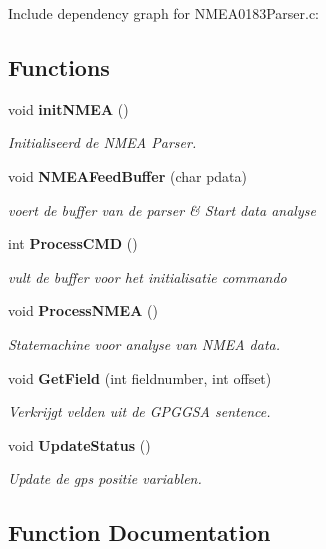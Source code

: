 Include dependency graph for NMEA0183Parser.c:\subsection*{Functions}
\begin{CompactItemize}
\item 
void {\bf initNMEA} ()
\begin{CompactList}\small\item\em Initialiseerd de NMEA Parser. \item\end{CompactList}\item 
void {\bf NMEAFeedBuffer} (char pdata)
\begin{CompactList}\small\item\em voert de buffer van de parser \& Start data analyse \item\end{CompactList}\item 
int {\bf ProcessCMD} ()
\begin{CompactList}\small\item\em vult de buffer voor het initialisatie commando \item\end{CompactList}\item 
void {\bf ProcessNMEA} ()
\begin{CompactList}\small\item\em Statemachine voor analyse van NMEA data. \item\end{CompactList}\item 
void {\bf GetField} (int fieldnumber, int offset)
\begin{CompactList}\small\item\em Verkrijgt velden uit de GPGGSA sentence. \item\end{CompactList}\item 
void {\bf UpdateStatus} ()
\begin{CompactList}\small\item\em Update de gps positie variablen. \item\end{CompactList}\end{CompactItemize}


\subsection{Function Documentation}
